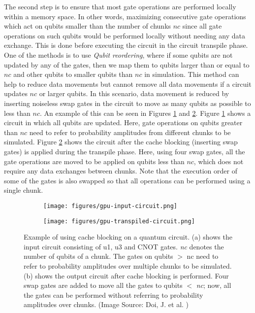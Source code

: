 The second step is to ensure that most gate operations are performed locally within a memory space. In other words, maximizing consecutive gate operations which act on qubits smaller than the number of chunks $nc$ since all gate operations on such qubits would be performed locally without needing any data exchange. This is done before executing the circuit in the circuit transpile phase. One of the methods is to use \textit{Qubit reordering}, where if some qubits are not updated by any of the gates, then we map them to qubits larger than or equal to $nc$ and other qubits to smaller qubits than $nc$ in simulation. This method can help to reduce data movements but cannot remove all data movements if a circuit updates $nc$ or larger qubits. In this scenario, data movement is reduced by inserting noiseless swap gates in the circuit to move as many qubits as possible to less than $nc$. An example of this can be seen in Figures \ref{fig:gpu-input-circuit} and \ref{fig:gpu-transpiled-circuit}. Figure \ref{fig:gpu-input-circuit} shows a circuit in which all qubits are updated. Here, gate operations on qubits greater than $nc$ need to refer to probability amplitudes from different chunks to be simulated. Figure \ref{fig:gpu-transpiled-circuit} shows the circuit after the cache blocking (inserting swap gates) is applied during the transpile phase. Here, using four swap gates, all the gate operations are moved to be applied on qubits less than $nc$, which does not require any data exchanges between chunks. Note that the execution order of some of the gates is also swapped so that all operations can be performed using a single chunk. 


\begin{figure*}[htbp]
\centering
\begin{subfigure}{0.35\textwidth}
  \centering
  \texttt{[image: figures/gpu-input-circuit.png]}
  \caption{}
  \label{fig:gpu-input-circuit}
\end{subfigure}%
\begin{subfigure}{0.55\textwidth}
  \centering
  \texttt{[image: figures/gpu-transpiled-circuit.png]}
  \caption{}
  \label{fig:gpu-transpiled-circuit}
\end{subfigure}
\caption{ Example of using cache blocking on a quantum circuit. (a) shows the input circuit consisting of u1, u3 and CNOT gates. \textit{nc} denotes the number of qubits of a chunk. The gates on qubits $>$ nc need to refer to probability amplitudes over multiple chunks to be simulated. (b) shows the output circuit after cache blocking is performed. Four swap gates are added to move all the gates to qubits $<$ \textit{nc}; now, all the gates can be performed without referring to probability amplitudes over chunks. (Image Source: Doi, J. et al. \cite{qiskitGPUpaper}) }
\label{fig:gpu-circuit}
\end{figure*}



